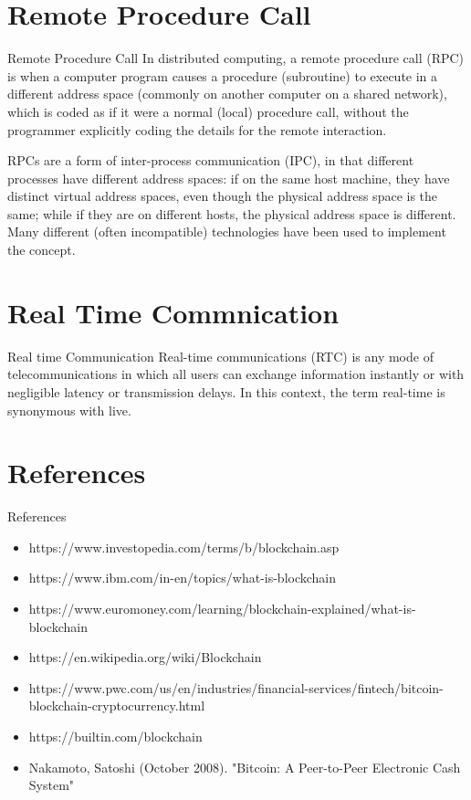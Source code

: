 \documentclass{beamer}
\begin{document}
	\section{Remote Procedure Call}
	\begin{frame}{Remote Procedure Call}
		\normalsize
		In distributed computing, a remote procedure call (RPC) is when a computer program causes a procedure (subroutine) to execute in a different address space (commonly on another computer on a shared network), which is coded as if it were a normal (local) procedure call, without the programmer explicitly coding the details for the remote interaction.
		\par
		RPCs are a form of inter-process communication (IPC), in that different processes have different address spaces: if on the same host machine, they have distinct virtual address spaces, even though the physical address space is the same; while if they are on different hosts, the physical address space is different. Many different (often incompatible) technologies have been used to implement the concept. 
	\end{frame}

	\section{Real Time Commnication}
	\begin{frame}{Real time Communication}
		\normalsize
		Real-time communications (RTC) is any mode of telecommunications in which all users can exchange information instantly or with negligible latency or transmission delays. In this context, the term real-time is synonymous with live.
	\end{frame}

	\section{References}
	\begin{frame}{References}
	\begin{itemize}
		\item https://www.investopedia.com/terms/b/blockchain.asp
		\item https://www.ibm.com/in-en/topics/what-is-blockchain
		\item https://www.euromoney.com/learning/blockchain-explained/what-is-blockchain
		\item https://en.wikipedia.org/wiki/Blockchain
		\item https://www.pwc.com/us/en/industries/financial-services/fintech/bitcoin-blockchain-cryptocurrency.html
		\item https://builtin.com/blockchain
		\item Nakamoto, Satoshi (October 2008). "Bitcoin: A Peer-to-Peer Electronic Cash System"
	\end{itemize}
	\end{frame}
\end{document}
